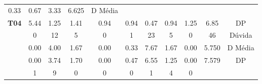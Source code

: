 \begin{table}[htbp]
\begin{tabular}{|ccccccccccc|}
		\multicolumn{1}{c|}{\cellcolor[HTML]{D9D9D9}0.33} &
		\multicolumn{1}{c|}{\cellcolor[HTML]{D9D9D9}0.67} &
		\multicolumn{1}{c|}{\cellcolor[HTML]{D9D9D9}3.33} &
		\multicolumn{1}{c|}{\cellcolor[HTML]{D9D9D9}6.625} &
		D Média \\ \cline{2-11} 
		\multicolumn{1}{|c|}{\multirow{-3}{*}{\cellcolor[HTML]{F2F2F2}\textbf{T04}}} &
		\multicolumn{1}{c|}{5.44} &
		\multicolumn{1}{c|}{1.25} &
		\multicolumn{1}{c|}{1.41} &
		\multicolumn{1}{c|}{0.94} &
		\multicolumn{1}{c|}{0.94} &
		\multicolumn{1}{c|}{0.47} &
		\multicolumn{1}{c|}{0.94} &
		\multicolumn{1}{c|}{1.25} &
		\multicolumn{1}{c|}{6.85} &
		DP \\ \hline
		\rowcolor[HTML]{D9D9D9} 
		\multicolumn{1}{|c|}{\cellcolor[HTML]{F2F2F2}} &
		\multicolumn{1}{c|}{\cellcolor[HTML]{D9D9D9}0} &
		\multicolumn{1}{c|}{\cellcolor[HTML]{D9D9D9}12} &
		\multicolumn{1}{c|}{\cellcolor[HTML]{D9D9D9}5} &
		\multicolumn{1}{c|}{\cellcolor[HTML]{D9D9D9}0} &
		\multicolumn{1}{c|}{\cellcolor[HTML]{D9D9D9}1} &
		\multicolumn{1}{c|}{\cellcolor[HTML]{D9D9D9}23} &
		\multicolumn{1}{c|}{\cellcolor[HTML]{D9D9D9}5} &
		\multicolumn{1}{c|}{\cellcolor[HTML]{D9D9D9}0} &
		\multicolumn{1}{c|}{\cellcolor[HTML]{D9D9D9}46} &
		Dúvida \\ \cline{2-11} 
		\multicolumn{1}{|c|}{\cellcolor[HTML]{F2F2F2}} &
		\multicolumn{1}{c|}{0.00} &
		\multicolumn{1}{c|}{4.00} &
		\multicolumn{1}{c|}{1.67} &
		\multicolumn{1}{c|}{0.00} &
		\multicolumn{1}{c|}{0.33} &
		\multicolumn{1}{c|}{7.67} &
		\multicolumn{1}{c|}{1.67} &
		\multicolumn{1}{c|}{0.00} &
		\multicolumn{1}{c|}{5.750} &
		D Média \\ \cline{2-11} 
		\rowcolor[HTML]{D9D9D9} 
		\multicolumn{1}{|c|}{\multirow{-3}{*}{\cellcolor[HTML]{F2F2F2}\textbf{T05}}} &
		\multicolumn{1}{c|}{\cellcolor[HTML]{D9D9D9}0.00} &
		\multicolumn{1}{c|}{\cellcolor[HTML]{D9D9D9}3.74} &
		\multicolumn{1}{c|}{\cellcolor[HTML]{D9D9D9}1.70} &
		\multicolumn{1}{c|}{\cellcolor[HTML]{D9D9D9}0.00} &
		\multicolumn{1}{c|}{\cellcolor[HTML]{D9D9D9}0.47} &
		\multicolumn{1}{c|}{\cellcolor[HTML]{D9D9D9}6.55} &
		\multicolumn{1}{c|}{\cellcolor[HTML]{D9D9D9}1.25} &
		\multicolumn{1}{c|}{\cellcolor[HTML]{D9D9D9}0.00} &
		\multicolumn{1}{c|}{\cellcolor[HTML]{D9D9D9}7.579} &
		DP \\ \hline
		\multicolumn{1}{|c|}{\cellcolor[HTML]{F2F2F2}} &
		\multicolumn{1}{c|}{1} &
		\multicolumn{1}{c|}{9} &
		\multicolumn{1}{c|}{0} &
		\multicolumn{1}{c|}{0} &
		\multicolumn{1}{c|}{0} &
		\multicolumn{1}{c|}{1} &
		\multicolumn{1}{c|}{4} &
		\multicolumn{1}{c|}{0} &

\end{tabular}
\end{table}
